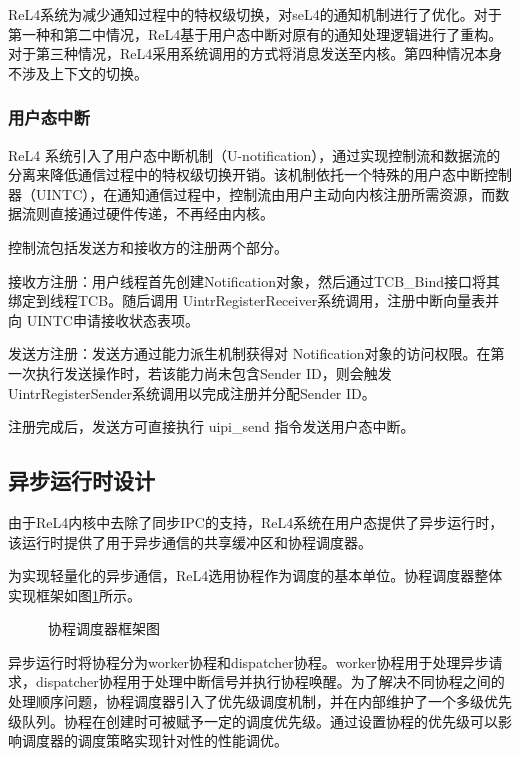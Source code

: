 ReL4系统为减少通知过程中的特权级切换，对seL4的通知机制进行了优化。对于第一种和第二中情况，ReL4基于用户态中断对原有的通知处理逻辑进行了重构。对于第三种情况，ReL4采用系统调用的方式将消息发送至内核。第四种情况本身不涉及上下文的切换。

\subsubsection{用户态中断}

ReL4 系统引入了用户态中断机制（U-notification），通过实现控制流和数据流的分离来降低通信过程中的特权级切换开销。该机制依托一个特殊的用户态中断控制器（UINTC），在通知通信过程中，控制流由用户主动向内核注册所需资源，而数据流则直接通过硬件传递，不再经由内核。

控制流包括发送方和接收方的注册两个部分。

接收方注册：用户线程首先创建Notification对象，然后通过TCB\_Bind接口将其绑定到线程TCB。随后调用 UintrRegisterReceiver系统调用，注册中断向量表并向 UINTC申请接收状态表项。

发送方注册：发送方通过能力派生机制获得对 Notification对象的访问权限。在第一次执行发送操作时，若该能力尚未包含Sender ID，则会触发UintrRegisterSender系统调用以完成注册并分配Sender ID。

注册完成后，发送方可直接执行 uipi\_send 指令发送用户态中断。

\subsection{异步运行时设计}

由于ReL4内核中去除了同步IPC的支持，ReL4系统在用户态提供了异步运行时，该运行时提供了用于异步通信的共享缓冲区和协程调度器。

为实现轻量化的异步通信，ReL4选用协程作为调度的基本单位。协程调度器整体实现框架如图\ref{Executor}所示\cite{rel4_kernel}。

\begin{figure}[htbp]
    \centering
    
    \caption{协程调度器框架图}\label{Executor}
\end{figure}


异步运行时将协程分为worker协程和dispatcher协程。worker协程用于处理异步请求，dispatcher协程用于处理中断信号并执行协程唤醒。为了解决不同协程之间的处理顺序问题，协程调度器引入了优先级调度机制，并在内部维护了一个多级优先级队列。协程在创建时可被赋予一定的调度优先级。通过设置协程的优先级可以影响调度器的调度策略实现针对性的性能调优。

